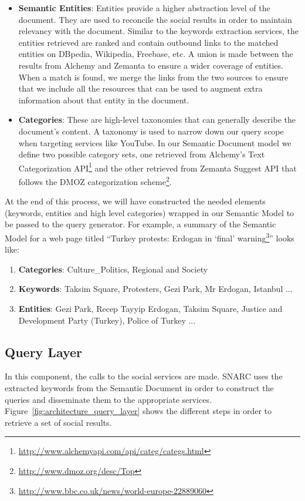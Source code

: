\begin{enumerate}
\begin{itemize}
    \item \textbf{Semantic Entities}: Entities provide a higher abstraction level of the document. They are used to reconcile the social results in order to maintain relevancy with the document. Similar to the keywords extraction services, the entities retrieved are ranked and contain outbound links to the matched entities on DBpedia, Wikipedia, Freebase, etc. A union is made between the results from Alchemy and Zemanta to ensure a wider coverage of entities. When a match is found, we merge the links from the two sources to ensure that we include all the resources that can be used to augment extra information about that entity in the document.

    \item \textbf{Categories}: These are high-level taxonomies that can generally describe the document's content. A taxonomy is used to narrow down our query scope when targeting services like YouTube. In our Semantic Document model we define two possible category sets, one retrieved from Alchemy's Text Categorization API\footnote{\url{http://www.alchemyapi.com/api/categ/categs.html}} and the other retrieved from Zemanta Suggest API that follows the DMOZ categorization scheme\footnote{\url{http://www.dmoz.org/desc/Top}}.
  \end{itemize}
\end{enumerate}

At the end of this process, we will have constructed the needed elements (keywords, entities and high level categories) wrapped in our Semantic Model to be passed to the query generator. For example, a summary of the Semantic Model for a web page titled ``Turkey protests: Erdogan in `final' warning\footnote{\url{http://www.bbc.co.uk/news/world-europe-22889060}}'' looks like:

\begin{enumerate}

  \item \textbf{Categories}: Culture\_Politics, Regional and Society
  \item \textbf{Keywords}: Taksim Square, Protesters, Gezi Park, Mr Erdogan, Istanbul ...
  \item \textbf{Entities}: Gezi Park, Recep Tayyip Erdogan, Taksim Square, Justice and Development Party (Turkey), Police of Turkey ...

\end{enumerate}

\subsection{Query Layer}
In this component, the calls to the social services are made. SNARC uses the extracted keywords from the Semantic Document in order to construct the queries and disseminate them to the appropriate services. Figure~\ref{fig:architecture_query_layer} shows the different steps in order to retrieve a set of social results.

